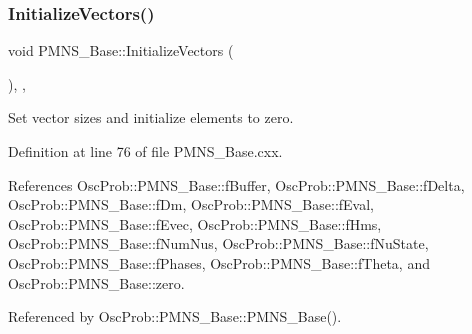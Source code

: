 \subsubsection{\texorpdfstring{Initialize\+Vectors()}{InitializeVectors()}}
{\footnotesize\ttfamily void P\+M\+N\+S\+\_\+\+Base\+::\+Initialize\+Vectors (\begin{DoxyParamCaption}{ }\end{DoxyParamCaption})\hspace{0.3cm}{\ttfamily [protected]}, {\ttfamily [virtual]}, {\ttfamily [inherited]}}

Set vector sizes and initialize elements to zero. 

Definition at line 76 of file P\+M\+N\+S\+\_\+\+Base.\+cxx.



References Osc\+Prob\+::\+P\+M\+N\+S\+\_\+\+Base\+::f\+Buffer, Osc\+Prob\+::\+P\+M\+N\+S\+\_\+\+Base\+::f\+Delta, Osc\+Prob\+::\+P\+M\+N\+S\+\_\+\+Base\+::f\+Dm, Osc\+Prob\+::\+P\+M\+N\+S\+\_\+\+Base\+::f\+Eval, Osc\+Prob\+::\+P\+M\+N\+S\+\_\+\+Base\+::f\+Evec, Osc\+Prob\+::\+P\+M\+N\+S\+\_\+\+Base\+::f\+Hms, Osc\+Prob\+::\+P\+M\+N\+S\+\_\+\+Base\+::f\+Num\+Nus, Osc\+Prob\+::\+P\+M\+N\+S\+\_\+\+Base\+::f\+Nu\+State, Osc\+Prob\+::\+P\+M\+N\+S\+\_\+\+Base\+::f\+Phases, Osc\+Prob\+::\+P\+M\+N\+S\+\_\+\+Base\+::f\+Theta, and Osc\+Prob\+::\+P\+M\+N\+S\+\_\+\+Base\+::zero.



Referenced by Osc\+Prob\+::\+P\+M\+N\+S\+\_\+\+Base\+::\+P\+M\+N\+S\+\_\+\+Base().


